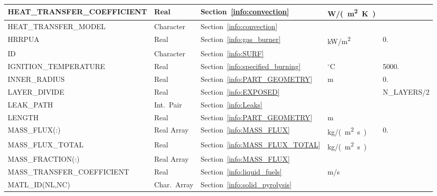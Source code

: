 \documentclass[11pt]{book}
\begin{document}
\begin{longtable}{@{\extracolsep{\fill}}|l|l|l|l|l|}
{\ct HEAT\_TRANSFER\_COEFFICIENT}     & Real            & Section~\ref{info:convection}             & \si{W/(m^2.K)}      &                         \\ \hline
{\ct HEAT\_TRANSFER\_MODEL}           & Character       & Section~\ref{info:convection}             &                     &                         \\ \hline
{\ct HRRPUA}                          & Real            & Section~\ref{info:gas_burner}             & \si{kW/m^2}         & 0.                      \\ \hline
{\ct ID}                              & Character       & Section~\ref{info:SURF}                   &                     &                         \\ \hline
{\ct IGNITION\_TEMPERATURE}           & Real            & Section~\ref{info:specified_burning}      & $^\circ$C           & 5000.                   \\ \hline
{\ct INNER\_RADIUS}                   & Real            & Section~\ref{info:PART_GEOMETRY}          & m                   & 0.                      \\ \hline
{\ct LAYER\_DIVIDE}                   & Real            & Section~\ref{info:EXPOSED}                &                     & {\ct N\_LAYERS}/2       \\ \hline
{\ct LEAK\_PATH}                      & Int.~Pair       & Section~\ref{info:Leaks}                  &                     &                         \\ \hline
{\ct LENGTH}                          & Real            & Section~\ref{info:PART_GEOMETRY}          & m                   &                         \\ \hline
{\ct MASS\_FLUX(:)}                   & Real Array      & Section~\ref{info:MASS_FLUX}              & \si{kg/(m^2.s)}     & 0.                      \\ \hline
{\ct MASS\_FLUX\_TOTAL}               & Real            & Section~\ref{info:MASS_FLUX_TOTAL}        & \si{kg/(m^2.s)}     &                         \\ \hline
{\ct MASS\_FRACTION(:)}               & Real Array      & Section~\ref{info:MASS_FLUX}              &                     &                         \\ \hline
{\ct MASS\_TRANSFER\_COEFFICIENT}     & Real            & Section~\ref{info:liquid_fuels}           & m/s                 &                         \\ \hline
{\ct MATL\_ID(NL,NC)}                 & Char.~Array     & Section~\ref{info:solid_pyrolysis}        &                     &                         \\ \hline

\end{longtable}
\end{document}
